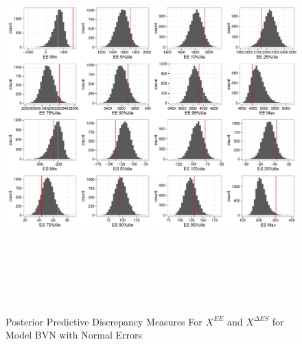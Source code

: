 \documentclass[11pt]{article}\usepackage[]{graphicx}\usepackage[]{color}
\begin{document}
 \begin{figure}
  \centering
  \includegraphics[width=17cm,height=15cm]{manual_figure/wpxdiagbvn.pdf}
  \caption{Posterior Predictive Discrepancy Measures For $X^{EE}$ and $X^{\Delta ES}$ for Model BVN with Normal Errors}
  \label{wpxdiagbvn}
  \end{figure}
\end{document}
